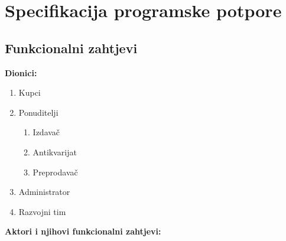 \setcounter{chapter}{2}
\chapter{Specifikacija programske potpore}

\section{Funkcionalni zahtjevi}

\noindent \textbf{Dionici:}

\begin{enumerate}
	
	\item Kupci 
	\item Ponuditelji
	\begin{enumerate}
		\item Izdavač
		\item Antikvarijat
		\item Preprodavač
	\end{enumerate}	
	\item Administrator		
	\item Razvojni tim
	
\end{enumerate}

\noindent \textbf{Aktori i njihovi funkcionalni zahtjevi:}


